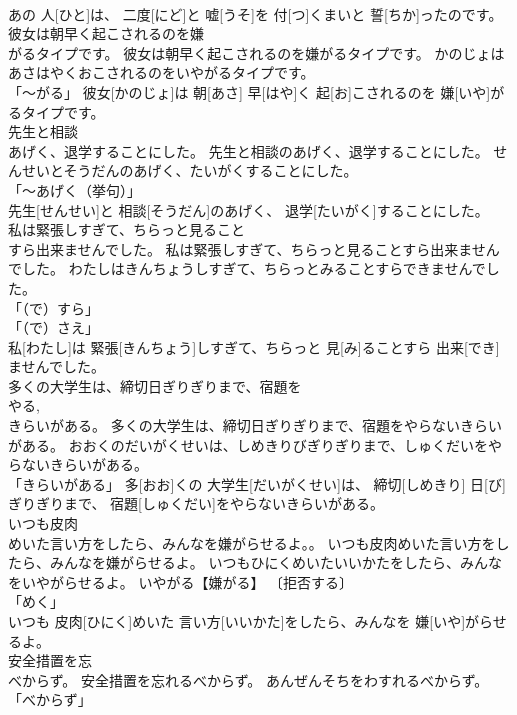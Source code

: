 \documentclass[8pt]{extreport}
\begin{document}
\begin{CJK}{UTF8}{min}
\\	あの 人[ひと]は、 二度[にど]と 嘘[うそ]を 付[つ]くまいと 誓[ちか]ったのです。		
\\	彼女は朝早く起こされるのを嫌
\\	がるタイプです。	彼女は朝早く起こされるのを嫌がるタイプです。	かのじょはあさはやくおこされるのをいやがるタイプです。	
\\	「～がる」	彼女[かのじょ]は 朝[あさ] 早[はや]く 起[お]こされるのを 嫌[いや]がるタイプです。		
\\	先生と相談
\\	あげく、退学することにした。	先生と相談のあげく、退学することにした。	せんせいとそうだんのあげく、たいがくすることにした。	
\\	「～あげく（挙句）」 
\\	先生[せんせい]と 相談[そうだん]のあげく、 退学[たいがく]することにした。		
\\	私は緊張しすぎて、ちらっと見ること
\\	すら出来ませんでした。	私は緊張しすぎて、ちらっと見ることすら出来ませんでした。	わたしはきんちょうしすぎて、ちらっとみることすらできませんでした。	
\\	「（で）すら」 
\\	「（で）さえ」 
\\	私[わたし]は 緊張[きんちょう]しすぎて、ちらっと 見[み]ることすら 出来[でき]ませんでした。		
\\	多くの大学生は、締切日ぎりぎりまで、宿題を
\\	やる, 
\\	きらいがある。	多くの大学生は、締切日ぎりぎりまで、宿題をやらないきらいがある。	おおくのだいがくせいは、しめきりびぎりぎりまで、しゅくだいをやらないきらいがある。	
\\	「きらいがある」	多[おお]くの 大学生[だいがくせい]は、 締切[しめきり] 日[び]ぎりぎりまで、 宿題[しゅくだい]をやらないきらいがある。		
\\	いつも皮肉
\\	めいた言い方をしたら、みんなを嫌がらせるよ。。	いつも皮肉めいた言い方をしたら、みんなを嫌がらせるよ。	いつもひにくめいたいいかたをしたら、みんなをいやがらせるよ。 いやがる【嫌がる】 〔拒否する〕 
\\	「めく」 
\\	いつも 皮肉[ひにく]めいた 言い方[いいかた]をしたら、みんなを 嫌[いや]がらせるよ。		
\\	安全措置を忘
\\	べからず。	安全措置を忘れるべからず。	あんぜんそちをわすれるべからず。	
\\	「べからず」 

\end{CJK}
\end{document}
